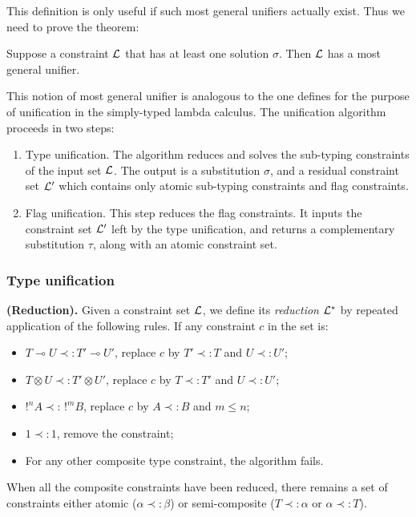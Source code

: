 This definition is only useful if such most general unifiers actually exist. Thus we need to prove the theorem:
\begin{thm}
	\label{existence-MGU}
	Suppose a constraint $\mathcal{L}$ that has at least one solution $\sigma$. Then $\mathcal{L}$ has a most general unifier.
\end{thm}

This notion of most general unifier is analogous to the one defines for the purpose of unification in the simply-typed lambda calculus.
The unification algorithm proceeds in two steps:
	\begin{enumerate}
		\item Type unification. The algorithm reduces and solves the sub-typing constraints of the input set $\mathcal{L}$.
			The output is a substitution $\sigma$, and a residual constraint set $\mathcal{L}'$ which contains only atomic sub-typing constraints and
			flag constraints.
			
		\item Flag unification. This step reduces the flag constraints. It inputs the constraint set $\mathcal{L}'$ left by the type unification,
			and returns a complementary substitution $\tau$, along with an atomic constraint set.
	\end{enumerate}

\subsubsection{Type unification}

\begin{algorithm}{\bf (Reduction).}
  Given a constraint set $\mathcal{L}$, we define its {\em reduction} $\mathcal{L}^*$ by repeated application of the following rules.
  If any constraint $c$ in the set is:
  	\begin{itemize}
      \item $T \multimap U \prec: T' \multimap U'$, replace $c$ by $T' \prec: T$ and $U \prec: U'$;
      \item $T \otimes U \prec: T' \otimes U'$, replace $c$ by $T \prec: T'$ and $U \prec: U'$;
      \item $!^n A \prec: \, !^m B$, replace $c$ by $A \prec: B$ and $m \le n$;
      \item $1 \prec: 1$, remove the constraint;
      \item For any other composite type constraint, the algorithm fails.
    \end{itemize}
  When all the composite constraints have been reduced, there remains a set of constraints either atomic ($\alpha \prec: \beta$) or
  semi-composite ($T \prec: \alpha$ or $\alpha \prec: T$).
\end{algorithm}

